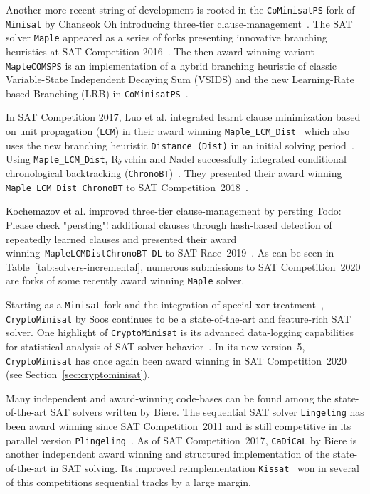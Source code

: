\documentclass{elsarticle}
\newcommand{\todo}[1]{{\color{purple}Todo: #1}}
\newcommand{\solver}[1]{\texttt{#1}}
\begin{document}
Another more recent string of development is rooted in the \solver{CoMinisatPS} fork of \solver{Minisat} by Chanseok Oh introducing three-tier clause-management~\cite{Oh:2015:satunsat}. 
The SAT solver \solver{Maple} appeared as a series of forks presenting innovative branching heuristics at SAT Competition 2016~\cite{Liang:2016:LRB}. 
The then award winning variant \solver{MapleCOMSPS} is an implementation of a hybrid branching heuristic of classic Variable-State Independent Decaying Sum (VSIDS) and the new Learning-Rate based Branching (LRB) in \solver{CoMinisatPS}~\cite{Liang:2016:MapleCOMSPS}. 

In SAT Competition 2017, Luo et al. integrated learnt clause minimization based on unit propagation (\solver{LCM}) in their award winning \solver{Maple\_LCM\_Dist}~\cite{Luo:2017:LCM} which also uses the new branching heuristic \solver{Distance (Dist)} in an initial solving period~\cite{Xiao:2017:MapleLCMDist}. 
Using \solver{Maple\_LCM\_Dist}, Ryvchin and Nadel successfully integrated conditional chronological backtracking (\solver{ChronoBT})~\cite{Nadel:2018:CBT}. 
They presented their award winning \solver{Maple\_LCM\_Dist\_ChronoBT} to SAT Competition~2018~\cite{Ryvchin:SC2018:MapleChronoBT}. 

Kochemazov et al. improved three-tier clause-management by persting \todo{Please check "persting"!}
additional clauses through hash-based detection of repeatedly learned clauses and presented their award winning~\solver{MapleLCMDistChronoBT-DL} to SAT Race~2019~\cite{Kochemazov:SC2019:MapleChronoBTDL}. 
As can be seen in Table~\ref{tab:solvers-incremental}, numerous submissions to SAT Competition~2020 are forks of some recently award winning \solver{Maple} solver. 

Starting as a \solver{Minisat}-fork and the integration of special xor treatment~\cite{Soos:2009:Crypto}, \solver{CryptoMinisat} by Soos continues to be a state-of-the-art and feature-rich SAT solver. 
One highlight of \solver{CryptoMinisat} is its advanced data-logging capabilities for statistical analysis of SAT solver behavior~\cite{Soos:2019:ChrystalBall}. 
In its new version~5, \solver{CryptoMinisat} has once again been award winning in SAT Competition~2020 (see Section~\ref{sec:cryptominisat}). 

Many independent and award-winning code-bases can be found among the state-of-the-art SAT solvers written by Biere. 
The sequential SAT solver \solver{Lingeling} has been award winning since SAT Competition~2011 and is still competitive in its parallel version \solver{Plingeling}~\cite{Biere:2012:Lingeling}. 
As of SAT Competition~2017, \solver{CaDiCaL} %
by Biere is another independent award winning and structured implementation of the state-of-the-art in SAT solving. 
Its improved reimplementation \solver{Kissat}~\cite{Biere:SC2020} won in several of this competitions sequential tracks by a large margin. 
\end{document}
